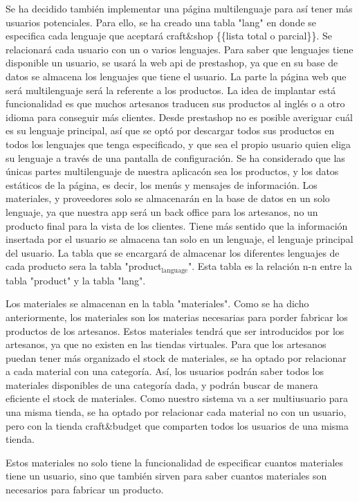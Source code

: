 \documentclass[11pt]{article}
\begin{document}
Se ha decidido también implementar una página multilenguaje para así
tener más usuarios potenciales. Para ello, se ha creado una tabla
"lang" en donde se especifica cada lenguaje que aceptará craft\&shop
\{\{lista total o parcial\}\}. Se relacionará cada usuario con un o
varios lenguajes. Para saber que lenguajes tiene disponible un
usuario, se usará la web api de prestashop, ya que en su base de
datos se almacena los lenguajes que tiene el usuario. La parte la
página web que será multilenguaje será la referente a los
productos. La idea de implantar está funcionalidad es que muchos
artesanos traducen sus productos al inglés o a otro idioma para
conseguir más clientes. Desde prestashop no es posible averiguar
cuál es su lenguaje principal, así que se optó por descargar todos
sus productos en todos los lenguajes que tenga especificado, y que
sea el propio usuario quien eliga su lenguaje a través de una
pantalla de configuración. Se ha considerado que las únicas partes
multilenguaje de nuestra aplicacón sea los productos, y los datos
estáticos de la página, es decir, los menús y mensajes de
información. Los materiales, y proveedores solo se almacenarán en la
base de datos en un solo lenguaje, ya que nuestra app será un back
office para los artesanos, no un producto final para la vista de los
clientes. Tiene más sentido que la información insertada por el
usuario se almacena tan solo en un lenguaje, el lenguaje principal
del usuario. La tabla que se encargará de almacenar los diferentes
lenguajes de cada producto sera la tabla "product$_{\text{language}}$". Esta
tabla es la relación n-n entre la tabla "product" y  la tabla "lang".

Los materiales se almacenan en la tabla "materiales". Como se ha
dicho anteriormente, los materiales son los materias necesarias para
porder fabricar los productos de los artesanos. Estos materiales
tendrá que ser introducidos por los artesanos, ya que no existen en
las tiendas virtuales. Para que los artesanos puedan tener más
organizado el stock de materiales, se ha optado por relacionar a
cada material con una categoría. Así, los usuarios podrán saber
todos los materiales disponibles de una categoría dada, y podrán
buscar de manera eficiente el stock de materiales. Como nuestro
sistema va a ser multiusuario para una misma tienda, se ha optado
por relacionar cada material no con un usuario, pero con la tienda
craft\&budget que comparten todos los usuarios de una misma
tienda. 

Estos materiales no solo tiene la funcionalidad de especificar
cuantos materiales tiene un usuario, sino que también sirven para
saber cuantos materiales son necesarios para fabricar un producto.
\end{document}
